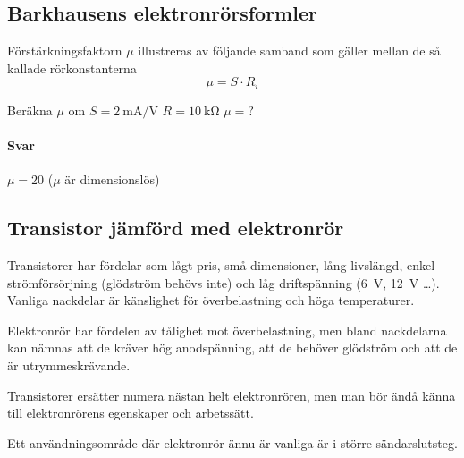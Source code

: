 \subsection{Barkhausens elektronrörsformler}

Förstärkningsfaktorn \(\mu \) illustreras av följande samband som gäller mellan
de så kallade rörkonstanterna
\[\mu = S \cdot R_i\]
\begin{tcolorbox}[title=Exempel]
Beräkna \(\mu\)  om \(S = \qty{2}{\milli\ampere\per\volt}\) \(R = \qty{10}{\kilo\ohm}\) \(\mu = ?\)
\tcblower
\paragraph{Svar} \(\mu = 20\) (\(\mu\)  är dimensionslös)
\end{tcolorbox}

\subsection{Transistor jämförd med elektronrör}

Transistorer har fördelar som lågt pris, små dimensioner, lång livslängd, enkel
strömförsörjning (glödström behövs inte) och låg driftspänning (\qty{6}{\volt},
\qty{12}{\volt} \ldots ).
Vanliga nackdelar är känslighet för överbelastning och höga temperaturer.

Elektronrör har fördelen av tålighet mot överbelastning, men bland nackdelarna
kan nämnas att de kräver hög anodspänning, att de behöver glödström och att de
är utrymmeskrävande.

Transistorer ersätter numera nästan helt elektronrören, men man bör ändå känna
till elektronrörens egenskaper och arbetssätt.

Ett användningsområde där elektronrör ännu är vanliga är i större
sändarslutsteg.
